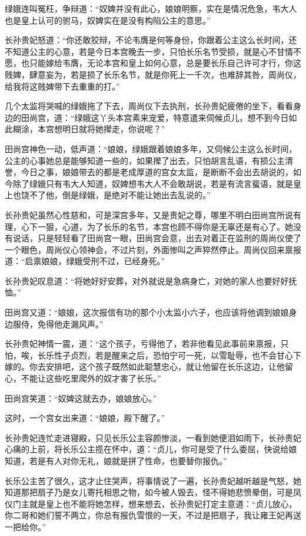 绿娥连叫冤枉，争辩道：“奴婢并没有此心，娘娘明察，实在是情况危急，韦大人也是皇上认可的驸马，奴婢实在是没有构陷公主的意思。”

长孙贵妃怒道：“你还敢狡辩，不论韦膺是何等身份，你跟着公主这么长时间，还不知道公主的心意，若是今日本宫晚去一步，只怕长乐名节受损，就是心不甘情不愿，也只能嫁给韦膺，无论本宫和皇上如何心意，总是要长乐自己许可才行，你这贱婢，肆意妄为，若是损了长乐名节，就是你死上一千次，也难辞其咎，周尚仪，给我将这贱婢带下去重重的打。”

几个太监将哭喊的绿娥拖了下去，周尚仪下去执刑，长孙贵妃疲倦的坐下，看看身边的田尚宫，道：“绿娥这丫头本宫素来宠爱，特意遣来伺候贞儿，想不到今日如此糊涂，本宫想明日就将她撵走，你说呢？”

田尚宫神色一动，低声道：“娘娘，绿娥跟着娘娘多年，又伺候公主这么长时间，公主的心事她总是能够知道一些的，如果撵了出去，只怕胡言乱语，有损公主清誉，今日之事，娘娘带去的都是老成厚道的宫女太监，是断断不会出去胡说的，如今除了绿娥只有韦大人知道，奴婢想韦大人不会敢胡说，若是有流言蜚语，就是皇上也饶不了他，倒是绿娥，是绝对不能让她出去乱说的。”

长孙贵妃虽然心性慈和，可是深宫多年，又是贵妃之尊，哪里不明白田尚宫所说有理，心下一狠，心道，为了长乐的名节，本宫也顾不得你是无辜还是有心了。她没有说话，只是轻轻看了田尚宫一眼，田尚宫会意，出去对着正在监刑的周尚仪使了一个眼色，周尚仪心领神会，不过片刻，外面惨叫之声猝然停止。周尚仪回来禀报道：“启禀娘娘，绿娥受刑不过，已经身死。”

长孙贵妃叹息道：“将她好好安葬，对外就说是急病身亡，对她的家人也要好好抚恤。”

田尚宫又道：“娘娘，这次报信有功的那个小太监小六子，也应该将他调到娘娘身边服侍，免得他走漏风声。”

长孙贵妃神情一震，道：“这个孩子，亏得他了，若非他看见此事前来禀报，只怕，唉，长乐性子贞烈，若是醒来之后，恐怕宁可一死，以雪耻辱，也不会甘心下嫁的。你去安排吧，这个孩子既然如此聪慧忠心，就让他留在长乐这边，让他留心，不能让这些吃里爬外的奴才害了长乐。”

田尚宫笑道：“奴婢这就去办，娘娘放心。”

这时，一个宫女出来道：“娘娘，殿下醒了。”

长孙贵妃连忙走进寝殿，只见长乐公主容颜惨淡，一看到她便泪如雨下，长孙贵妃心痛的上前，将长乐公主揽在怀中，道：“贞儿，你可是受了什么委屈，快说给娘知道，若是有人对你无礼，娘就是拼了性命，也要替你报仇。”

长乐公主苦了很久，这才止住哭声，将事情说了一遍，长孙贵妃越听越是气怒，她知道那把扇子乃是女儿寄托相思之物，如今被人毁去，怪不得她悲愤晕倒，可是凤仪门主就是皇上也不能将她怎样，想来想去，长孙贵妃打定主意道：“贞儿放心，你二哥和她们誓不两立，你总有报仇雪恨的一天，不过是把扇子，我让雍王妃再送一把给你。”

